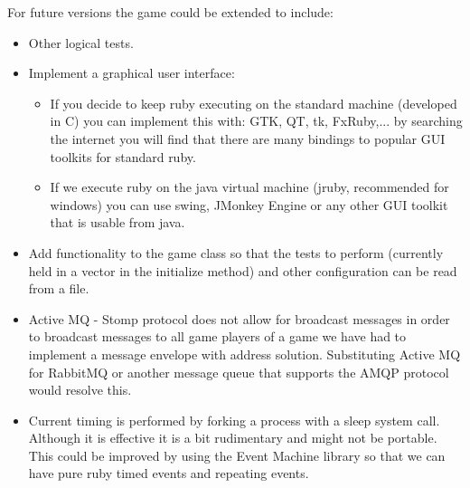 \documentclass[a4paper,10pt,titlepage]{article}
\begin{document}
\par For future versions the game could be extended to include:
\begin{itemize}
	\item Other logical tests.
	\item Implement a graphical user interface:
	\begin{itemize}
		\item If you decide to keep ruby executing on the standard machine (developed in C) you can implement this with: GTK, QT, tk, FxRuby,... by searching the internet you will find that there are many bindings to popular GUI toolkits for standard ruby.
		\item If we execute ruby on the java virtual machine (jruby, recommended for windows) you can use swing, JMonkey Engine or any other GUI toolkit that is usable from java. 
	\end{itemize}
	\item Add functionality to the game class so that the tests to perform (currently held in a vector in the initialize method) and other configuration can be read from a file.
	\item Active MQ - Stomp protocol does not allow for broadcast messages in order to broadcast messages to all game players of a game we have had to implement a message envelope with address solution. Substituting Active MQ for RabbitMQ or another message queue that supports the AMQP protocol would resolve this.
	\item Current timing is performed by forking a process with a sleep system call. Although it is effective it is a bit rudimentary and might not be portable. This could be improved by using the Event Machine library so that we can have pure ruby timed events and repeating events.
	 
\end{itemize}
\end{document}
